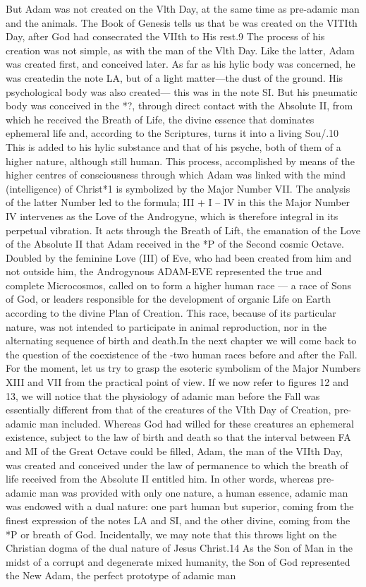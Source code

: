 \begin{quotex}
But Adam was not created on the Vlth Day, at the same time as pre-adamic man and the animals. The Book of Genesis tells us that be was created on the VITIth Day, after God had consecrated the VIIth to His rest.9 The process of his creation was not simple, as with the man of the Vlth Day. Like the latter, Adam was created first, and conceived later. As far as his hylic body was concerned, he was createdin the note LA, but of a light matter---the dust of the ground. His psychological body was also created--- this was in the note SI. But his pneumatic body was conceived in the *?, through direct contact with the Absolute II, from which he received the Breath of Life, the divine essence that dominates ephemeral life and, according to the Scriptures, turns it into a living Sou/.10 This is added to his hylic substance and that of his psyche, both of them of a higher nature, although still human. This process, accomplished by means of the higher centres of consciousness through which Adam was linked with the mind (intelligence) of Christ*1 is symbolized by the Major Number VII. The analysis of the latter Number led to the formula; III + I -- IV in this the Major Number IV intervenes as the Love of the Androgyne, which is therefore integral in its perpetual vibration. It acts through the Breath of Lift, the emanation of the Love of the Absolute II that Adam received in the *P of the Second cosmic Octave. Doubled by the feminine Love (III) of Eve, who had been created from him and not outside him, the Androgynous ADAM-EVE represented the true and complete Microcosmos, called on to form a higher human race --- a race of Sons of God, or leaders responsible for the development of organic Life on Earth according to the divine Plan of Creation. This race, because of its particular nature, was not intended to participate in animal reproduction, nor in the alternating sequence of birth and death.In the next chapter we will come back to the question of the coexistence of the -two human races before and after the Fall. For the moment, let us try to grasp the esoteric symbolism of the Major Numbers XIII and VII from the practical point of view. If we now refer to figures 12 and 13, we will notice that the physiology of adamic man before the Fall was essentially different from that of the creatures of the VIth Day of Creation, pre-adamic man included. Whereas God had willed for these creatures an ephemeral existence, subject to the law of birth and death so that the interval between FA and MI of the Great Octave could be filled, Adam, the man of the VIIth Day, was created and conceived under the law of permanence to which the breath of life received from the Absolute II entitled him. In other words, whereas pre-adamic man was provided with only one nature, a human essence, adamic man was endowed with a dual nature: one part human but superior, coming from the finest expression of the notes LA and SI, and the other divine, coming from the *P or breath of God. Incidentally, we may note that this throws light on the Christian dogma of the dual nature of Jesus Christ.14 As the Son of Man in the midst of a corrupt and degenerate mixed humanity, the Son of God represented the New Adam, the perfect prototype of adamic man 
\end{quotex}
